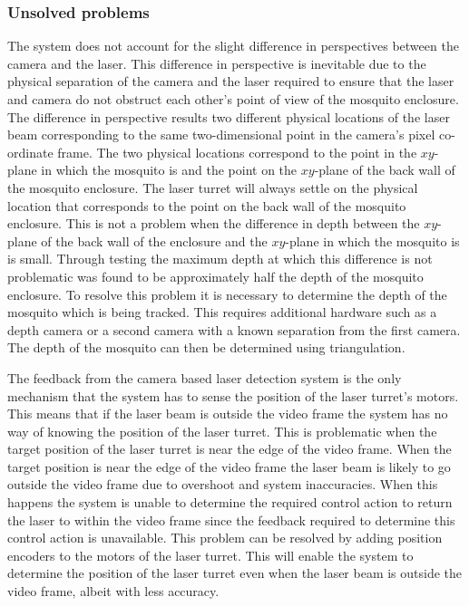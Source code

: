 \subsubsection{Unsolved problems}\label{sec:unsolved_problems}
The system does not account for the slight difference in perspectives between the camera and the laser. This difference in perspective is inevitable due to the physical separation of the camera and the laser required to ensure that the laser and camera do not obstruct each other's point of view of the mosquito enclosure. The difference in perspective results two different physical locations of the laser beam corresponding to the same two-dimensional point in the camera's pixel co-ordinate frame. The two physical locations correspond to the point in the $xy$-plane in which the mosquito is and the point on the $xy$-plane of the back wall of the mosquito enclosure. The laser turret will always settle on the physical location that corresponds to the point on the back wall of the mosquito enclosure. This is not a problem when the difference in depth between the $xy$-plane of the back wall of the enclosure and the $xy$-plane in which the mosquito is is small. Through testing the maximum depth at which this difference is not problematic was found to be approximately half the depth of the mosquito enclosure. To resolve this problem it is necessary to determine the depth of the mosquito which is being tracked. This requires additional hardware such as a depth camera or a second camera with a known separation from the first camera. The depth of the mosquito can then be determined using triangulation.

The feedback from the camera based laser detection system is the only mechanism that the system has to sense the position of the laser turret's motors. This means that if the laser beam is outside the video frame the system has no way of knowing the position of the laser turret. This is problematic when the target position of the laser turret is near the edge of the video frame. When the target position is near the edge of the video frame the laser beam is likely to go outside the video frame due to overshoot and system inaccuracies. When this happens the system is unable to determine the required control action to return the laser to within the video frame since the feedback required to determine this control action is unavailable. This problem can be resolved by adding position encoders to the motors of the laser turret. This will enable the system to determine the position of the laser turret even when the laser beam is outside the video frame, albeit with less accuracy.


